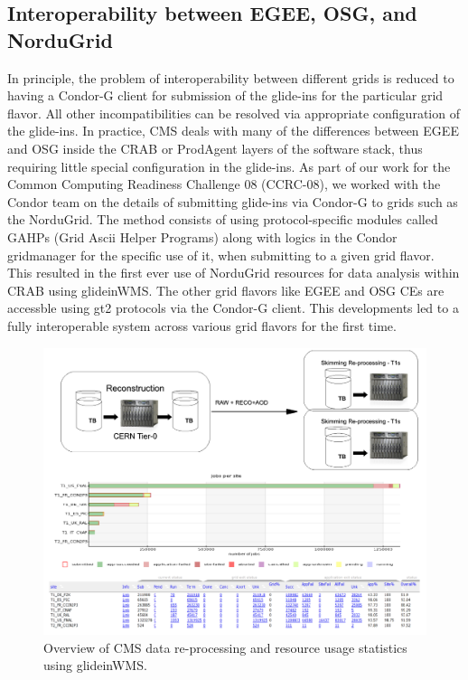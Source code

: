 \documentclass[a4paper]{jpconf}
\begin{document}
\subsection {Interoperability between EGEE, OSG, and NorduGrid}
In principle, the problem of interoperability between different grids is reduced to having a Condor-G client
for submission of the glide-ins for the particular grid flavor. All other incompatibilities can be 
resolved via appropriate configuration of the glide-ins. In practice, CMS deals with many of the differences 
between EGEE and OSG inside the CRAB or ProdAgent layers of the software stack, thus requiring little special 
configuration in the glide-ins. As part of our work for the Common Computing Readiness Challenge 08 (CCRC-08), we worked 
with the Condor team on the details of submitting glide-ins via Condor-G to grids such as the NorduGrid. The method 
consists of using protocol-specific modules called GAHPs (Grid Ascii Helper Programs) along with logics in the Condor gridmanager for the 
specific use of it, when submitting to a given grid flavor. This resulted 
in the first ever use of NorduGrid resources for data analysis within CRAB using glideinWMS. The other grid flavors like 
EGEE and OSG CEs are accessble using gt2 protocols via the Condor-G client. This developments led to
a fully interoperable system across various grid flavors for the first time.
\begin{figure}
\begin{center}
\includegraphics[scale=0.5]{DataReprocess}
\end{center}
\caption{Overview of CMS data re-processing and resource usage statistics using glideinWMS.}
\label{fig:reprocessT1s}
\end{figure}
\end{document}
